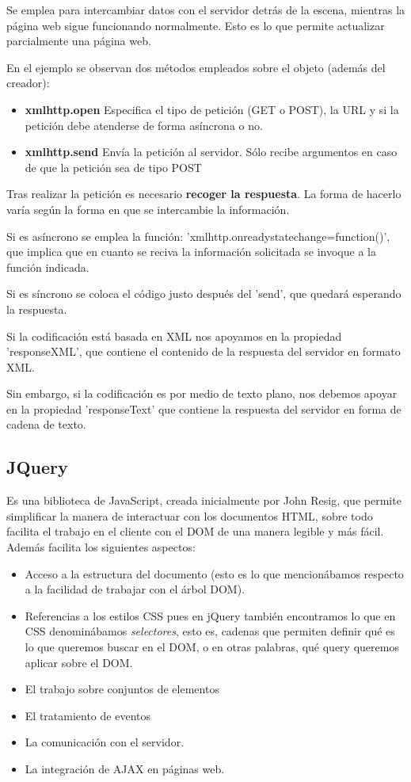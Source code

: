 \documentclass{apuntes}
\begin{document}
Se emplea para intercambiar datos con el servidor detrás de la escena, mientras la página web sigue funcionando normalmente. Esto es lo que permite actualizar parcialmente una página web.

En el ejemplo se observan dos métodos empleados sobre el objeto (además del creador):
\begin{itemize}
\item \textbf{xmlhttp.open}
Especifica el tipo de petición (GET o POST), la URL y si la petición debe atenderse de forma asíncrona o no.
\item \textbf{xmlhttp.send}
Envía la petición al servidor. Sólo recibe argumentos en caso de que la petición sea de tipo POST
\end{itemize}

Tras realizar la petición es necesario \textbf{recoger la respuesta}. La forma de hacerlo varía según la forma en que se intercambie la información.

Si es asíncrono se emplea la función: 'xmlhttp.onreadystatechange=function()', que implica que en cuanto se reciva la información solicitada se invoque a la función indicada.

Si es síncrono se coloca el código justo después del 'send', que quedará esperando la respuesta.

Si la codificación está basada en XML nos apoyamos en la propiedad 'responseXML', que contiene el contenido de la respuesta del servidor en formato XML.

Sin embargo, si la codificación es por medio de texto plano, nos debemos apoyar en la propiedad 'responseText' que contiene la respuesta del servidor en forma de cadena de texto.

\subsection{JQuery}
Es una biblioteca de JavaScript, creada inicialmente por John Resig, que permite simplificar la manera de interactuar con los documentos HTML, sobre todo facilita  el trabajo en el cliente con el DOM de una manera legible y más fácil. Además facilita los siguientes aspectos:
\begin{itemize}
\item Acceso a la estructura del documento (esto es lo que mencionábamos respecto a la facilidad de trabajar con el árbol DOM).
\item Referencias a los estilos CSS pues en jQuery también encontramos lo que en CSS denominábamos \emph{selectores}, esto es, cadenas que permiten definir qué es lo que queremos buscar en el DOM, o en otras palabras, qué query queremos aplicar sobre el DOM.
\item El trabajo sobre conjuntos de elementos
\item El tratamiento de eventos
\item La comunicación con el servidor.
\item La integración de AJAX en páginas web.
\end{itemize}
\end{document}
